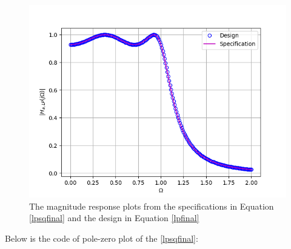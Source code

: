 \documentclass[article]{IEEEtran}
\theoremstyle{remark}
\numberwithin{equation}{subsection}
\begin{document}
\begin{enumerate}
\begin{figure}[!ht]
\centering
\includegraphics[width =\columnwidth]{figs/fig2.png}
\caption{The magnitude response plots from the specifications in Equation \ref{lpsqfinal} and the design in Equation \ref{lpfinal}}
\label{fig2}
\end{figure}

Below is the code of pole-zero plot of the \eqref{lpsqfinal}:


\end{enumerate}
\end{document}
